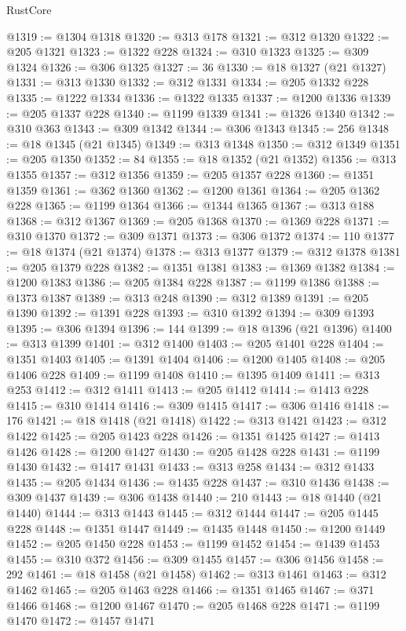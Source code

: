 \begin{lexlean}{RustCore}
\begin{coremodule}
@1319 := @1304 @1318
@1320 := @313 @178
@1321 := @312 @1320
@1322 := @205 @1321
@1323 := @1322 @228
@1324 := @310 @1323
@1325 := @309 @1324
@1326 := @306 @1325
@1327 := 36
@1330 := @18 @1327 (@21 @1327)
@1331 := @313 @1330
@1332 := @312 @1331
@1334 := @205 @1332 @228
@1335 := @1222 @1334
@1336 := @1322 @1335
@1337 := @1200 @1336
@1339 := @205 @1337 @228
@1340 := @1199 @1339
@1341 := @1326 @1340
@1342 := @310 @363
@1343 := @309 @1342
@1344 := @306 @1343
@1345 := 256
@1348 := @18 @1345 (@21 @1345)
@1349 := @313 @1348
@1350 := @312 @1349
@1351 := @205 @1350
@1352 := 84
@1355 := @18 @1352 (@21 @1352)
@1356 := @313 @1355
@1357 := @312 @1356
@1359 := @205 @1357 @228
@1360 := @1351 @1359
@1361 := @362 @1360
@1362 := @1200 @1361
@1364 := @205 @1362 @228
@1365 := @1199 @1364
@1366 := @1344 @1365
@1367 := @313 @188
@1368 := @312 @1367
@1369 := @205 @1368
@1370 := @1369 @228
@1371 := @310 @1370
@1372 := @309 @1371
@1373 := @306 @1372
@1374 := 110
@1377 := @18 @1374 (@21 @1374)
@1378 := @313 @1377
@1379 := @312 @1378
@1381 := @205 @1379 @228
@1382 := @1351 @1381
@1383 := @1369 @1382
@1384 := @1200 @1383
@1386 := @205 @1384 @228
@1387 := @1199 @1386
@1388 := @1373 @1387
@1389 := @313 @248
@1390 := @312 @1389
@1391 := @205 @1390
@1392 := @1391 @228
@1393 := @310 @1392
@1394 := @309 @1393
@1395 := @306 @1394
@1396 := 144
@1399 := @18 @1396 (@21 @1396)
@1400 := @313 @1399
@1401 := @312 @1400
@1403 := @205 @1401 @228
@1404 := @1351 @1403
@1405 := @1391 @1404
@1406 := @1200 @1405
@1408 := @205 @1406 @228
@1409 := @1199 @1408
@1410 := @1395 @1409
@1411 := @313 @253
@1412 := @312 @1411
@1413 := @205 @1412
@1414 := @1413 @228
@1415 := @310 @1414
@1416 := @309 @1415
@1417 := @306 @1416
@1418 := 176
@1421 := @18 @1418 (@21 @1418)
@1422 := @313 @1421
@1423 := @312 @1422
@1425 := @205 @1423 @228
@1426 := @1351 @1425
@1427 := @1413 @1426
@1428 := @1200 @1427
@1430 := @205 @1428 @228
@1431 := @1199 @1430
@1432 := @1417 @1431
@1433 := @313 @258
@1434 := @312 @1433
@1435 := @205 @1434
@1436 := @1435 @228
@1437 := @310 @1436
@1438 := @309 @1437
@1439 := @306 @1438
@1440 := 210
@1443 := @18 @1440 (@21 @1440)
@1444 := @313 @1443
@1445 := @312 @1444
@1447 := @205 @1445 @228
@1448 := @1351 @1447
@1449 := @1435 @1448
@1450 := @1200 @1449
@1452 := @205 @1450 @228
@1453 := @1199 @1452
@1454 := @1439 @1453
@1455 := @310 @372
@1456 := @309 @1455
@1457 := @306 @1456
@1458 := 292
@1461 := @18 @1458 (@21 @1458)
@1462 := @313 @1461
@1463 := @312 @1462
@1465 := @205 @1463 @228
@1466 := @1351 @1465
@1467 := @371 @1466
@1468 := @1200 @1467
@1470 := @205 @1468 @228
@1471 := @1199 @1470
@1472 := @1457 @1471

\end{coremodule}
\end{lexlean}
